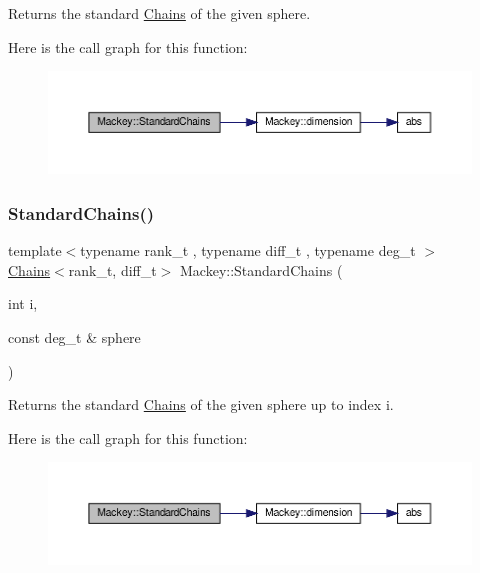 Returns the standard \hyperlink{classMackey_1_1Chains}{Chains} of the given sphere. 

Here is the call graph for this function\+:\nopagebreak
\begin{figure}[H]
\begin{center}
\leavevmode
\includegraphics[width=350pt]{namespaceMackey_a425b988266cedec0299fb539d99179b1_cgraph}
\end{center}
\end{figure}
\mbox{\label{namespaceMackey_aac9deeccbe291d1dd17df46a3d7c1f2b}} 
\subsubsection{\texorpdfstring{Standard\+Chains()}{StandardChains()}\hspace{0.1cm}{\footnotesize\ttfamily [2/2]}}
{\footnotesize\ttfamily template$<$typename rank\+\_\+t , typename diff\+\_\+t , typename deg\+\_\+t $>$ \\
\hyperlink{classMackey_1_1Chains}{Chains}$<$rank\+\_\+t, diff\+\_\+t$>$ Mackey\+::\+Standard\+Chains (\begin{DoxyParamCaption}\item[{int}]{i,  }\item[{const deg\+\_\+t \&}]{sphere }\end{DoxyParamCaption})}



Returns the standard \hyperlink{classMackey_1_1Chains}{Chains} of the given sphere up to index i. 

Here is the call graph for this function\+:\nopagebreak
\begin{figure}[H]
\begin{center}
\leavevmode
\includegraphics[width=350pt]{namespaceMackey_aac9deeccbe291d1dd17df46a3d7c1f2b_cgraph}
\end{center}
\end{figure}
\mbox{\label{namespaceMackey_a359aa27a035d2b1f1a3f2f8270fc9e52}} 
